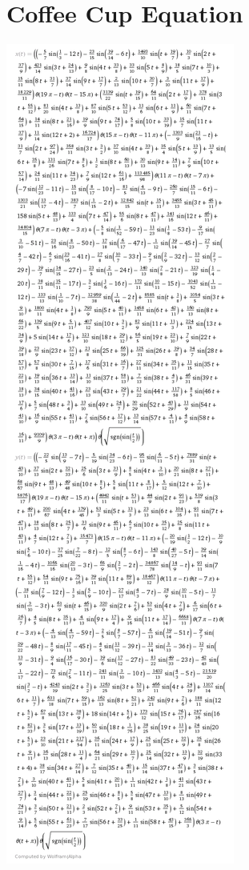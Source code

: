 \documentclass{article}
\begin{document}
\section{Coffee Cup Equation}
\nopagebreak
\begin{center}
\includegraphics[height=\textheight]{img/coffee-cup-eqns}
\end{center}
\end{document}
